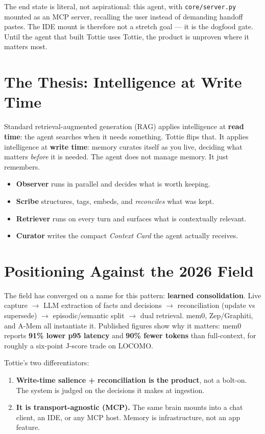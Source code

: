 The end state is literal, not aspirational: this agent, with \texttt{core/server.py}
mounted as an MCP server, recalling the user instead of demanding handoff pastes. The
IDE mount is therefore not a stretch goal --- it is the dogfood gate. Until the agent
that built Tottie uses Tottie, the product is unproven where it matters most.

\section{The Thesis: Intelligence at Write Time}
Standard retrieval-augmented generation (RAG) applies intelligence at \textbf{read time}: the agent
searches when it needs something. Tottie flips that. It applies intelligence at \textbf{write time}:
memory curates itself as you live, deciding what matters \emph{before} it is needed. The agent does
not manage memory. It just remembers.

\begin{itemize}
  \item \textbf{Observer} runs in parallel and decides what is worth keeping.
  \item \textbf{Scribe} structures, tags, embeds, and \emph{reconciles} what was kept.
  \item \textbf{Retriever} runs on every turn and surfaces what is contextually relevant.
  \item \textbf{Curator} writes the compact \emph{Context Card} the agent actually receives.
\end{itemize}

\section{Positioning Against the 2026 Field}
The field has converged on a name for this pattern: \textbf{learned consolidation}. Live capture
$\rightarrow$ LLM extraction of facts and decisions $\rightarrow$ reconciliation (update vs
supersede) $\rightarrow$ episodic/semantic split $\rightarrow$ dual retrieval. mem0, Zep/Graphiti,
and A-Mem all instantiate it. Published figures show why it matters: mem0 reports
\textbf{91\% lower p95 latency} and \textbf{90\% fewer tokens} than full-context, for roughly a
six-point J-score trade on LOCOMO.

Tottie's two differentiators:
\begin{enumerate}
  \item \textbf{Write-time salience + reconciliation is the product}, not a bolt-on. The system is
  judged on the decisions it makes at ingestion.
  \item \textbf{It is transport-agnostic (MCP).} The same brain mounts into a chat client, an IDE,
  or any MCP host. Memory is infrastructure, not an app feature.
\end{enumerate}

